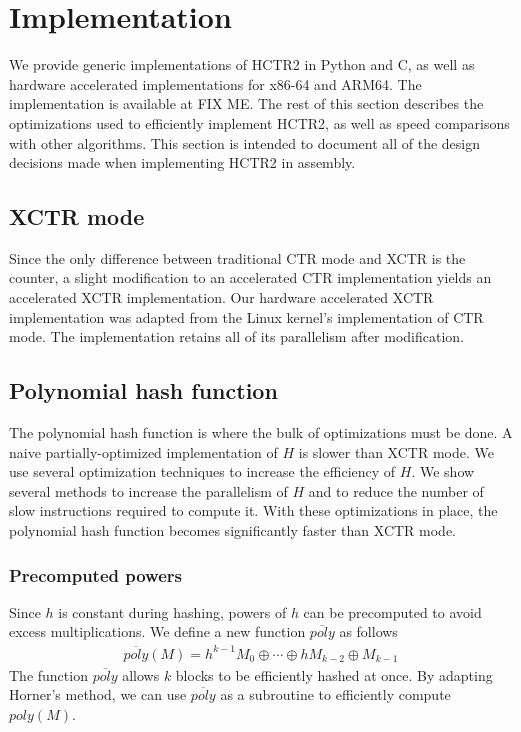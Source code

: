 \documentclass[hctr.tex]{subfiles}
\begin{document}
\section{Implementation}\label{implementation}
We provide generic implementations of HCTR2 in Python and C, as well as hardware accelerated implementations for x86-64 and ARM64. The implementation is available at {\color{red} FIX ME}. The rest of this section describes the optimizations used to efficiently implement HCTR2, as well as speed comparisons with other algorithms. This section is intended to document all of the design decisions made when implementing HCTR2 in assembly.

\subsection{XCTR mode}
Since the only difference between traditional CTR mode and XCTR is the counter, a slight modification to an accelerated CTR implementation yields an accelerated XCTR implementation. Our hardware accelerated XCTR implementation was adapted from the Linux kernel's implementation of CTR mode. The implementation retains all of its parallelism after modification. 

\subsection{Polynomial hash function}
The polynomial hash function is where the bulk of optimizations must be done. A naive partially-optimized implementation of $H$ is slower than XCTR mode. We use several optimization techniques to increase the efficiency of $H$. We show several methods to increase the parallelism of $H$ and to reduce the number of slow instructions required to compute it. With these optimizations in place, the polynomial hash function becomes significantly faster than XCTR mode.

\subsubsection{Precomputed powers}
Since $h$ is constant during hashing, powers of $h$ can be precomputed to avoid excess multiplications. We define a new function $\overline{poly}$ as follows
\begin{align*}
       \overline{poly}(M) = h^{k-1}M_0 \oplus \cdots \oplus hM_{k-2} \oplus M_{k-1}
\end{align*}
The function $\overline{poly}$ allows $k$ blocks to be efficiently hashed at once. By adapting Horner's method, we can use $\overline{poly}$ as a subroutine to efficiently compute $poly(M)$.
\end{document}
